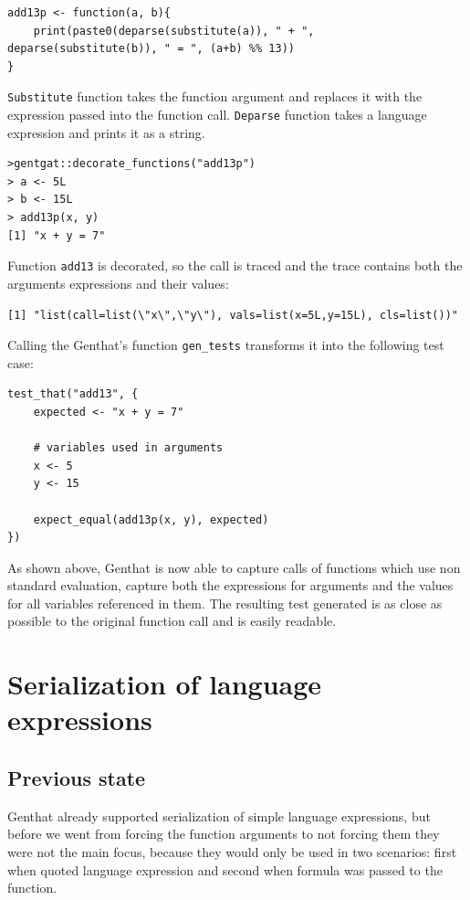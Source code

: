 \documentclass[thesis=B,english]{FITthesis}[2012/10/20]
\begin{document}
\begin{verbatim}
add13p <- function(a, b){
	print(paste0(deparse(substitute(a)), " + ", deparse(substitute(b)), " = ", (a+b) %% 13))
}
\end{verbatim}

\verb|Substitute| function takes the function argument and replaces it with the expression passed into the function call. \verb|Deparse| function takes a language expression and prints it as a string.

\begin{verbatim}
>gentgat::decorate_functions("add13p")
> a <- 5L
> b <- 15L
> add13p(x, y)
[1] "x + y = 7"
\end{verbatim}

Function \verb|add13| is decorated, so the call is traced and the trace contains both the arguments expressions and their values:

\begin{verbatim}
[1] "list(call=list(\"x\",\"y\"), vals=list(x=5L,y=15L), cls=list())"
\end{verbatim}

Calling the Genthat’s function \verb|gen_tests| transforms it into the following test case:

\begin{verbatim}
test_that("add13", {
    expected <- "x + y = 7"

    # variables used in arguments
    x <- 5
    y <- 15

    expect_equal(add13p(x, y), expected)
})
\end{verbatim}

As shown above, Genthat is now able to capture calls of functions which use non standard evaluation, capture both the expressions for arguments and the values for all variables referenced in them.  The resulting test generated is as close as possible to the original function call and is easily readable. 

\chapter{Serialization of language expressions}
\section{Previous state}
Genthat already supported serialization of simple language expressions, but before we went from forcing the function arguments to not forcing them they were not the main focus, because they would only be used in two scenarios:  first when quoted language expression and second when formula was passed to the function. 
\end{document}
